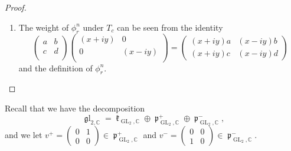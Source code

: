\documentclass[11pt, a4paper]{amsart}
\theoremstyle{plain}
\theoremstyle{definition}
\numberwithin{equation}{section}
\def\CC{\mathbb{C}}
\def\RR{\mathbb{R}}
\DeclareMathOperator{\Ind}{Ind}
\DeclareMathOperator{\GL}{\mathrm{GL}}
\DeclareMathOperator{\liek}{\mathfrak k}
\DeclareMathOperator{\liep}{\mathfrak p}
\DeclareMathOperator{\liegl}{\mathfrak gl}
\begin{document}
\begin{proof}
\begin{enumerate}
            \begin{equation*}
                 \phi_{r}^{n} \in \Ind_{B_{2}(\RR)^{+}}^{\GL_2(\RR)^{+}} \lambda(n + 2, -n). 
            \end{equation*}
        \item The weight of $\phi_{r}^{n}$ under $T_c$ can be seen from the identity 
        \begin{equation*}
            \begin{pmatrix}
                a & b \\
                c & d \\
            \end{pmatrix} \begin{pmatrix}
                            (x + iy) & 0 \\
                            0 & (x - iy) \\
                          \end{pmatrix} = \begin{pmatrix}
                                            (x + iy)a & (x - iy) b \\
                                            (x + iy)c & (x - iy) d 
                                         \end{pmatrix}
        \end{equation*} and the definition of $\phi_{r}^{n}$. 
    \end{enumerate}
\end{proof}

Recall that we have the decomposition 
\begin{equation*}
    \liegl_{2, \CC} = \liek_{\GL_{2}, \CC} \oplus \liep^{+}_{\GL_{2}, \CC} \oplus \liep^{-}_{\GL_{2}, \CC},
\end{equation*} and we let $v^{+} = \begin{pmatrix}
                                                            0 & 1 \\
                                                            0 & 0 
                                                       \end{pmatrix} \in \liep^{+}_{\GL_2, \CC}$ and 
                                                                                             $v^{-} = \begin{pmatrix}
                                                                                                0 & 0 \\
                                                                                                1 & 0  
                                                                                              \end{pmatrix} \in \liep^{-}_{\GL_2, \CC}$. 
\end{document}
